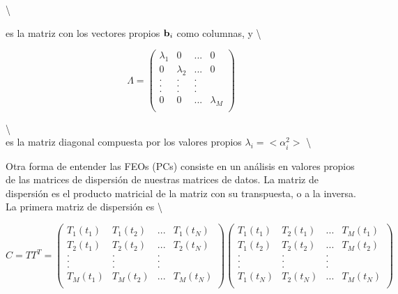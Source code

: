 \documentclass[
]{agujournal2019}
\begin{document}
\textbackslash{}

es la matriz con los vectores propios \({\textbf b}_i\) como columnas, y
\textbackslash{}

\begin{equation}
\Lambda=\left(\begin{array}{cccc}
   \lambda_1 & 0 & ... & 0\\
  0 & \lambda_2 & ... &0\\
        . & . & . \\
        . & . & . \\
        . & . & . \\
   0 & 0 & ... & \lambda_M\\
        \end{array}\right) 
\end{equation}

\textbackslash{}\\
es la matriz diagonal compuesta por los valores propios
\(\lambda_i=<\alpha_i^2>\) \textbackslash{}

Otra forma de entender las FEOs (PCs) consiste en un análisis en valores
propios de las matrices de dispersión de nuestras matrices de datos. La
matriz de dispersión es el producto matricial de la matriz con su
transpuesta, o a la inversa. La primera matriz de dispersión es
\textbackslash{}

\begin{equation}
{C}={T}{T}^T=\left(\begin{array}{cccc}
   T_{1}(t_1) & T_{1}(t_2) & ... & T_{1}(t_N)\\
   T_{2}(t_1) & T_{2}(t_2) & ... & T_{2}(t_N)\\
                . & . & . \\
        . & . & . \\
        . & . & . \\
   T_{M}(t_1) & T_{M}(t_2) & ... & T_{M}(t_N)\\
        \end{array}\right)
\left(\begin{array}{cccc}
   T_{1}(t_1) & T_{2}(t_1) & ... & T_{M}(t_1)\\
   T_{1}(t_2) & T_{2}(t_2) & ... & T_{M}(t_2)\\
                . & . & . \\
        . & . & . \\
        . & . & . \\
   T_{1}(t_N) & T_{2}(t_N) & ... & T_{M}(t_N)\\
        \end{array}\right)
  \end{equation}
\end{document}
